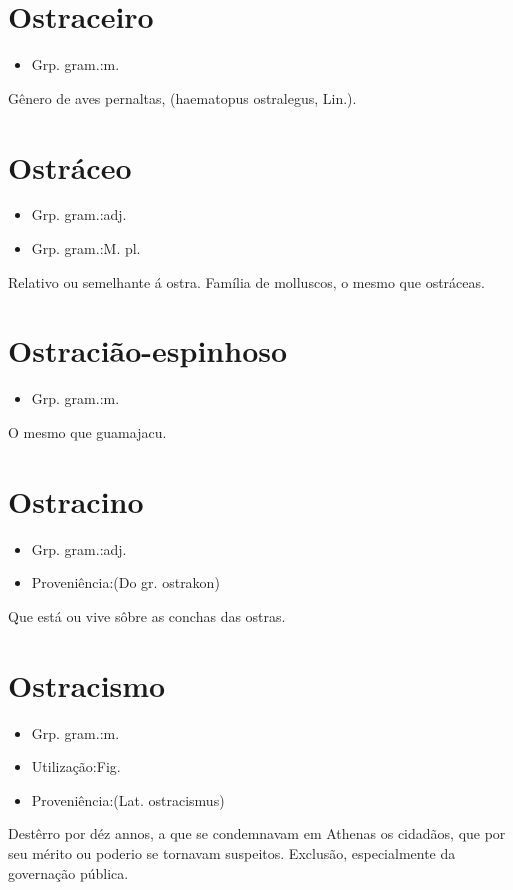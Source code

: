 \section{Ostraceiro}
\begin{itemize}
\item {Grp. gram.:m.}
\end{itemize}
Gênero de aves pernaltas, (\textunderscore haematopus ostralegus\textunderscore , Lin.).
\section{Ostráceo}
\begin{itemize}
\item {Grp. gram.:adj.}
\end{itemize}
\begin{itemize}
\item {Grp. gram.:M. pl.}
\end{itemize}
Relativo ou semelhante á ostra.
Família de molluscos, o mesmo que \textunderscore ostráceas\textunderscore .
\section{Ostracião-espinhoso}
\begin{itemize}
\item {Grp. gram.:m.}
\end{itemize}
O mesmo que \textunderscore guamajacu\textunderscore .
\section{Ostracino}
\begin{itemize}
\item {Grp. gram.:adj.}
\end{itemize}
\begin{itemize}
\item {Proveniência:(Do gr. \textunderscore ostrakon\textunderscore )}
\end{itemize}
Que está ou vive sôbre as conchas das ostras.
\section{Ostracismo}
\begin{itemize}
\item {Grp. gram.:m.}
\end{itemize}
\begin{itemize}
\item {Utilização:Fig.}
\end{itemize}
\begin{itemize}
\item {Proveniência:(Lat. \textunderscore ostracismus\textunderscore )}
\end{itemize}
Destêrro por déz annos, a que se condemnavam em Athenas os cidadãos, que por seu mérito ou poderio se tornavam suspeitos.
Exclusão, especialmente da governação pública.
